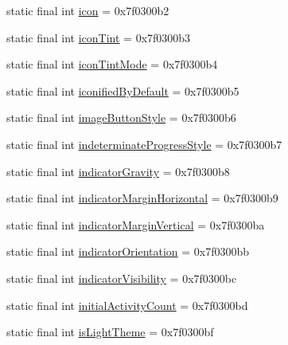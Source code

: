 \begin{DoxyCompactItemize}
\item 
static final int \mbox{\hyperlink{classcom_1_1synnapps_1_1carouselview_1_1_r_1_1attr_afbed98cb0b35b81493e7ebd897d0bcf6}{icon}} = 0x7f0300b2
\item 
static final int \mbox{\hyperlink{classcom_1_1synnapps_1_1carouselview_1_1_r_1_1attr_a9374b9c670d9c06e902d037b5c453e5b}{icon\+Tint}} = 0x7f0300b3
\item 
static final int \mbox{\hyperlink{classcom_1_1synnapps_1_1carouselview_1_1_r_1_1attr_a48ca6e4dc941b12593a749caeb287170}{icon\+Tint\+Mode}} = 0x7f0300b4
\item 
static final int \mbox{\hyperlink{classcom_1_1synnapps_1_1carouselview_1_1_r_1_1attr_ab7bce7c1ebcfaba3352d886601c5d69e}{iconified\+By\+Default}} = 0x7f0300b5
\item 
static final int \mbox{\hyperlink{classcom_1_1synnapps_1_1carouselview_1_1_r_1_1attr_a223ff72f3359b5f74a8b5a2789265dd7}{image\+Button\+Style}} = 0x7f0300b6
\item 
static final int \mbox{\hyperlink{classcom_1_1synnapps_1_1carouselview_1_1_r_1_1attr_ada8375b469432cce2f12147a6a486e34}{indeterminate\+Progress\+Style}} = 0x7f0300b7
\item 
static final int \mbox{\hyperlink{classcom_1_1synnapps_1_1carouselview_1_1_r_1_1attr_a9718ff3fd3f5d861cb25801f23f3da2d}{indicator\+Gravity}} = 0x7f0300b8
\item 
static final int \mbox{\hyperlink{classcom_1_1synnapps_1_1carouselview_1_1_r_1_1attr_a2f99ec9c213fe8ed5533562708f901e0}{indicator\+Margin\+Horizontal}} = 0x7f0300b9
\item 
static final int \mbox{\hyperlink{classcom_1_1synnapps_1_1carouselview_1_1_r_1_1attr_a11401219f764cba80c130fbc94c6ebf8}{indicator\+Margin\+Vertical}} = 0x7f0300ba
\item 
static final int \mbox{\hyperlink{classcom_1_1synnapps_1_1carouselview_1_1_r_1_1attr_a6f27231096c0f7c9a956a55bb2e77b85}{indicator\+Orientation}} = 0x7f0300bb
\item 
static final int \mbox{\hyperlink{classcom_1_1synnapps_1_1carouselview_1_1_r_1_1attr_a552f3f0ca8ee796dbfb69f5e79f27bc0}{indicator\+Visibility}} = 0x7f0300bc
\item 
static final int \mbox{\hyperlink{classcom_1_1synnapps_1_1carouselview_1_1_r_1_1attr_a1e9c69f46730c47522abda5c843988f8}{initial\+Activity\+Count}} = 0x7f0300bd
\item 
static final int \mbox{\hyperlink{classcom_1_1synnapps_1_1carouselview_1_1_r_1_1attr_a7baf9290c703b2dd754207af76ee69c3}{is\+Light\+Theme}} = 0x7f0300bf

\end{DoxyCompactItemize}

